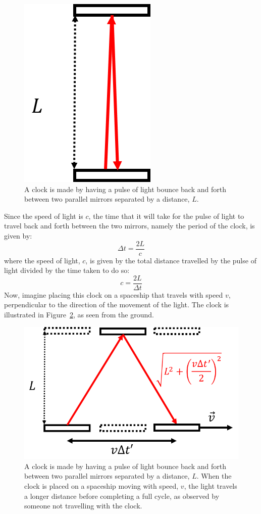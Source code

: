\begin{figure}[!htbp]
\centering
\includegraphics[width=0.2\linewidth]{files/clock_rest-2b24dfaa579d2edf2fef42f2f97bf7d5.png}
\caption[]{A clock is made by having a pulse of light bounce back and forth between two parallel mirrors separated by a distance, $L$.}
\label{fig:specialrelativity:clock_rest}
\end{figure}

Since the speed of light is $c$, the time that it will take for the pulse of light to travel back and forth between the two mirrors, namely the period of the clock, is given by:
\begin{equation}
\Delta t = \frac{2L}{c}
\end{equation}
where the speed of light, $c$, is given by the total distance travelled by the pulse of light divided by the time taken to do so:
\begin{equation}
c=\frac{2L}{\Delta t}
\end{equation}
Now, imagine placing this clock on a spaceship that travels with speed $v$, perpendicular to the direction of the movement of the light. The clock is illustrated in Figure~\ref{fig:specialrelativity:clock_moving}, as seen from the ground.

\begin{figure}[!htbp]
\centering
\includegraphics[width=0.5\linewidth]{files/clock_moving-bec37f43069648c48ba9eceb8c95a68f.png}
\caption[]{A clock is made by having a pulse of light bounce back and forth between two parallel mirrors separated by a distance, $L$. When the clock is placed on a spaceship moving with speed, $v$, the light travels a longer distance before completing a full cycle, as observed by someone not travelling with the clock.}
\label{fig:specialrelativity:clock_moving}
\end{figure}

